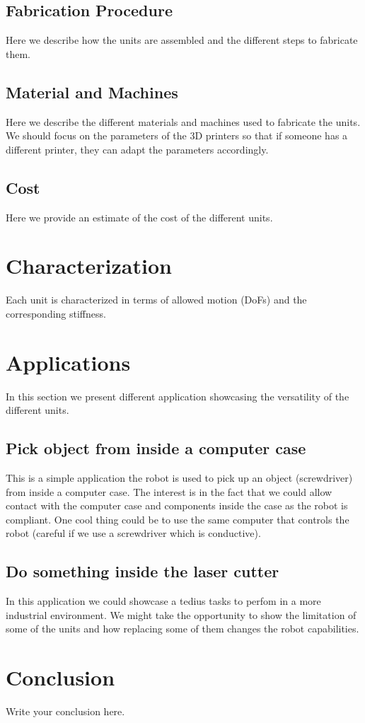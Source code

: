 \documentclass[12pt]{article}
\begin{document}
\subsection{Fabrication Procedure}
Here we describe how the units are assembled and the different steps to fabricate them.

\subsection{Material and Machines}
Here we describe the different materials and machines used to fabricate the units.
We should focus on the parameters of the 3D printers so that if someone has a different printer, they can adapt the parameters accordingly.

\subsection{Cost} 
Here we provide an estimate of the cost of the different units.

\section{Characterization}
Each unit is characterized in terms of allowed motion (DoFs) and the corresponding stiffness.


\section{Applications}
In this section we present different application showcasing the versatility of the different units.

\subsection{Pick object from inside a computer case}
This is a simple application the robot is used to pick up an object (screwdriver) from inside a computer case.
The interest is in the fact that we could allow contact with the computer case and components inside the case as the robot is compliant.
One cool thing could be to use the same computer that controls the robot (careful if we use a screwdriver which is conductive).

\subsection{Do something inside the laser cutter}
In this application we could showcase a tedius tasks to perfom in a more industrial environment.
We might take the opportunity to show the limitation of some of the units and how replacing some of them changes the robot capabilities.




\section{Conclusion}
Write your conclusion here.
\end{document}
